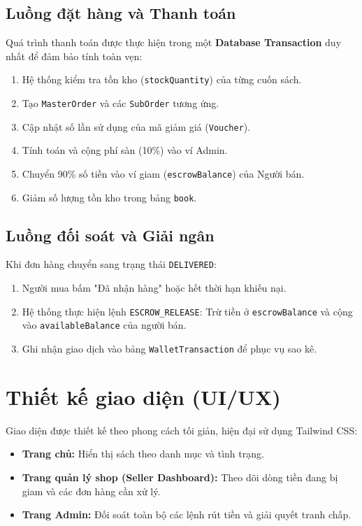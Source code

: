 \documentclass[../main.tex]{subfiles}
\begin{document}
\subsection{Luồng đặt hàng và Thanh toán}
Quá trình thanh toán được thực hiện trong một \textbf{Database Transaction} duy nhất để đảm bảo tính toàn vẹn:
\begin{enumerate}
    \item Hệ thống kiểm tra tồn kho (\texttt{stockQuantity}) của từng cuốn sách.
    \item Tạo \texttt{MasterOrder} và các \texttt{SubOrder} tương ứng.
    \item Cập nhật số lần sử dụng của mã giảm giá (\texttt{Voucher}).
    \item Tính toán và cộng phí sàn (10\%) vào ví Admin.
    \item Chuyển 90\% số tiền vào ví giam (\texttt{escrowBalance}) của Người bán.
    \item Giảm số lượng tồn kho trong bảng \texttt{book}.
\end{enumerate}

\subsection{Luồng đối soát và Giải ngân}
Khi đơn hàng chuyển sang trạng thái \texttt{DELIVERED}:
\begin{enumerate}
    \item Người mua bấm "Đã nhận hàng" hoặc hết thời hạn khiếu nại.
    \item Hệ thống thực hiện lệnh \texttt{ESCROW\_RELEASE}: Trừ tiền ở \texttt{escrowBalance} và cộng vào \texttt{availableBalance} của người bán.
    \item Ghi nhận giao dịch vào bảng \texttt{WalletTransaction} để phục vụ sao kê.
\end{enumerate}

\section{Thiết kế giao diện (UI/UX)}
Giao diện được thiết kế theo phong cách tối giản, hiện đại sử dụng Tailwind CSS:
\begin{itemize}
    \item \textbf{Trang chủ:} Hiển thị sách theo danh mục và tình trạng.
    \item \textbf{Trang quản lý shop (Seller Dashboard):} Theo dõi dòng tiền đang bị giam và các đơn hàng cần xử lý.
    \item \textbf{Trang Admin:} Đối soát toàn bộ các lệnh rút tiền và giải quyết tranh chấp.
\end{itemize}
\end{document}
